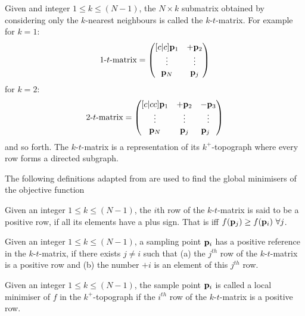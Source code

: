 Given and integer $1 \leq k \leq (N -1)$, the $N \times k$  submatrix obtained by considering only the $k$-nearest neighbours is called the $k$-$t$-matrix. For example for $k =1 $:
\begin{equation}
1 \textrm{-}t \textrm{-} \textrm{matrix} =
    \begin{pmatrix}[c|c]
  \bold{p}_1    & +\bold{p}_2\\
   \vdots   &   \vdots 	\\
   \bold{p}_N  & \bold{p}_j 		\\ 
    \end{pmatrix}
\end{equation}
for $k =2 $:
\begin{equation}
2 \textrm{-} t \textrm{-} \textrm{matrix} =
    \begin{pmatrix} [c|cc]
    \bold{p}_1   &  +\bold{p}_2 		& -\bold{p}_3			\\
    \vdots   &    \vdots 	&     \vdots 	\\
    \bold{p}_N  & \bold{p}_j  &  \bold{p}_j		\ \
    \end{pmatrix}
\end{equation}
and so forth. The  $k$-$t$-matrix is a representation of its $k^+$-topograph where every row forms a directed subgraph.

The following definitions adapted from \citet{Henderson2015} are used to find the global minimisers of the objective function
\begin{definition} \label{def:tgo1}
Given an integer $1 \leq k \leq (N -1)$, the $i$th row of the $k$-$t$-matrix is said to be a positive row, if all its elements have a plus sign. That is iff $ f(\bold{p}_j)  \geq f(\bold{p}_i)  ~\forall j$.
\end{definition}

\begin{definition} \label{def:tgo2}
 Given an integer $1 \leq k \leq (N -1)$,  a sampling point $\bold{p}_i$ has a positive reference in the $k$-$t$-matrix, if there exists $j \neq i$ such that (a) the $j^{th}$ row of the $k$-$t$-matrix is a positive row and (b) the number $+i$ is an element of this $j^{th}$ row. 
\end{definition}

\begin{definition} \label{def:tgo3}
Given an integer $1 \leq k \leq (N -1)$, the sample point $\bold{p}_i$ is called a local minimiser of $f$ in the $k^+$-topograph if the $i^{th}$ row of the $k$-$t$-matrix is a positive row.
\end{definition}

